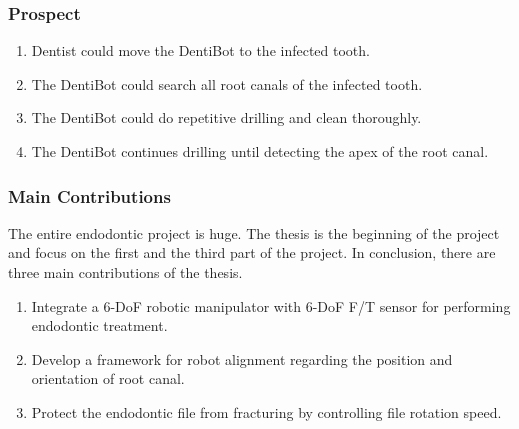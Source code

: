 \subsubsection{Prospect}
\begin{enumerate}
	\item Dentist could move the DentiBot to the infected tooth. 
	\item The DentiBot could search all root canals of the infected tooth.
	\item The DentiBot could do repetitive drilling and clean thoroughly.
	\item The DentiBot continues drilling until detecting the apex of the root canal.
\end{enumerate}	
\subsubsection{Main Contributions}
\hspace*{6mm}The entire endodontic project is huge. The thesis is the beginning of the project and focus on the first and the third part of the project. In conclusion, there are three main contributions of the thesis.
\begin{enumerate}
	\item	Integrate a 6-DoF robotic manipulator with 6-DoF F/T sensor for performing endodontic treatment.
	\item	Develop a framework for robot alignment regarding the position and orientation of root canal. 
	\item	Protect the endodontic file from fracturing by controlling file rotation speed.
\end{enumerate}
\newpage
